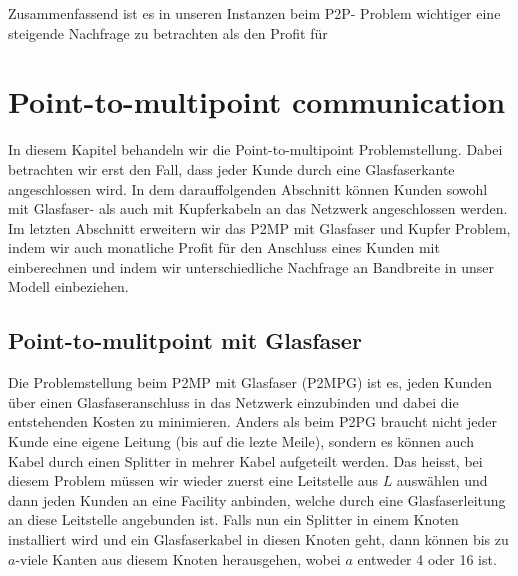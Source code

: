 \documentclass[11pt,a4paper]{article}
\theoremstyle{my_th_style1}
\begin{document}
Zusammenfassend ist es in unseren Instanzen beim P2P- Problem wichtiger eine steigende Nachfrage zu betrachten als den Profit für

\section{Point-to-multipoint communication}
In diesem Kapitel behandeln wir die Point-to-multipoint Problemstellung.  Dabei betrachten wir erst den Fall, dass jeder Kunde durch eine Glasfaserkante angeschlossen wird. In dem darauffolgenden Abschnitt k\"onnen Kunden sowohl mit Glasfaser- als auch mit Kupferkabeln an das Netzwerk angeschlossen werden. Im letzten Abschnitt erweitern wir das P2MP mit Glasfaser und Kupfer Problem, indem wir auch monatliche Profit f\"ur den Anschluss eines Kunden mit einberechnen und indem wir unterschiedliche Nachfrage an Bandbreite in unser Modell einbeziehen.

 
 \subsection{Point-to-mulitpoint mit Glasfaser}
 
 
 Die Problemstellung beim P2MP mit Glasfaser (P2MPG) ist es,  jeden Kunden \"uber einen Glasfaseranschluss in das Netzwerk einzubinden und dabei die entstehenden Kosten zu minimieren. Anders als beim P2PG braucht nicht jeder Kunde eine eigene Leitung (bis auf die lezte Meile), sondern es k\"onnen auch Kabel durch einen Splitter in mehrer Kabel aufgeteilt werden.  Das heisst, bei diesem Problem  m\"ussen wir wieder zuerst eine Leitstelle aus $L$ ausw\"ahlen und dann jeden Kunden an eine Facility anbinden, welche durch eine Glasfaserleitung  an diese Leitstelle angebunden ist. Falls nun ein Splitter in einem Knoten installiert wird und ein Glasfaserkabel in diesen Knoten geht, dann k\"onnen bis zu $a$-viele Kanten aus diesem Knoten herausgehen, wobei $a$ entweder 4 oder 16 ist.
\end{document}
